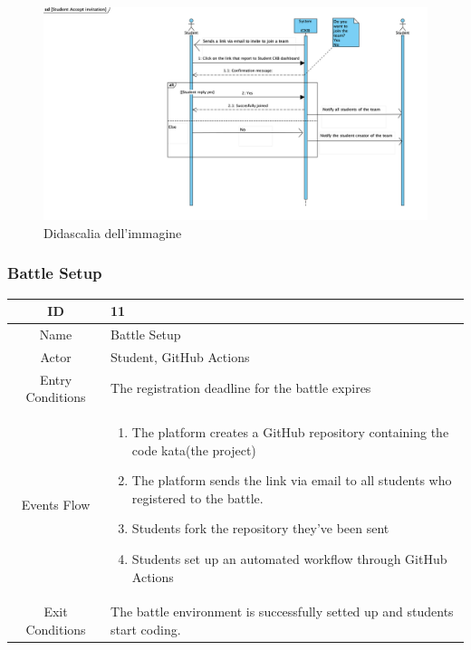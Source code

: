 \begin{figure}[H]
  \includegraphics[width=1\linewidth]{SequenceDiagram/Students Accepts invitation.png} 
  \caption{Didascalia dell'immagine}
  \label{fig:immagine}
\end{figure}



\subsubsection{Battle Setup}

\begin{longtable}{|c| p{10cm}|}
        \hline
            ID & 11 \\
        \hline
            Name & Battle Setup \\
        \hline
            Actor & Student, GitHub Actions \\
        \hline
            Entry Conditions & 
                     The registration deadline  for the battle expires
        
         \\
        \hline
            Events Flow &   \begin{enumerate}
                                \item The platform creates a GitHub repository containing the code kata(the project)
                                \item The platform sends the link via email to all students who registered to the battle.
                                \item  Students fork the repository they've been sent
                                \item  Students  set up an automated workflow through GitHub Actions 
                            \end{enumerate} \\
                            \hline
            Exit Conditions &
    
                             
                                    The battle environment  is successfully setted up and  students start coding.
                                \\
        \hline
            
    \end{longtable}

